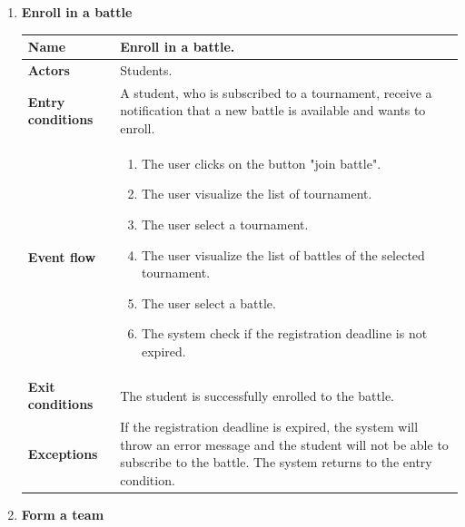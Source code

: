 \begin{enumerate}[label=\textbf{UC.\arabic*}]
\begin{table}[H]
\begin{tabular}{|m{3.2cm}|m{9.8cm}|}
                    \hline 
                \end{tabular}
        \end{table}
        \item {} \textbf{Enroll in a battle}
        \begin{table}[H]
    	    \centering
                \renewcommand{\arraystretch}{1.5}
                \begin{tabular}{|m{3.2cm}|m{9.8cm}|}
                    \hline
                    \textbf{Name} & Enroll in a battle. \\
                    \hline
                    \textbf{Actors} & Students. \\
                    \hline
                    \textbf{Entry conditions}  & A student, who is subscribed to a tournament, receive a notification that a new battle is available and wants to enroll.\\
                    \hline
                    \textbf{Event flow}  & 
                    \begin{enumerate}[label=\arabic*.]
                        \item The user clicks on the button "join battle".
                        \item The user visualize the list of tournament.
                        \item The user select a tournament.
                         \item The user visualize the list of battles of the selected tournament.
                        \item The user select a battle.
                        \item The system check if the registration deadline is not expired.
                    \end{enumerate}\\ 
                    \hline
                    \textbf{Exit conditions}  & The student is successfully enrolled to the battle. \\
                    \hline
                    \textbf{Exceptions}  & If the registration deadline is expired, the system will throw an error message and the student will not be able to subscribe to the battle. The system returns to the entry condition.  \\
                    \hline 
                \end{tabular}
        \end{table}
        \item {} \textbf{Form a team}

\end{enumerate}
